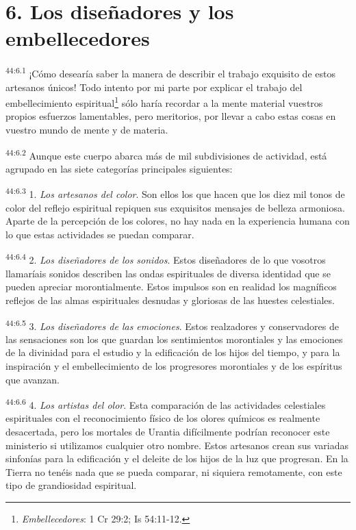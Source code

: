 \section*{6. Los diseñadores y los embellecedores}
\par
\textsuperscript{44:6.1} ¡Cómo desearía saber la manera de describir el trabajo exquisito de estos artesanos únicos! Todo intento por mi parte por explicar el trabajo del embellecimiento espiritual\footnote{\textit{Embellecedores}: 1 Cr 29:2; Is 54:11-12.} sólo haría recordar a la mente material vuestros propios esfuerzos lamentables, pero meritorios, por llevar a cabo estas cosas en vuestro mundo de mente y de materia.

\par
\textsuperscript{44:6.2} Aunque este cuerpo abarca más de mil subdivisiones de actividad, está agrupado en las siete categorías principales siguientes:

\par
\textsuperscript{44:6.3} 1. \textit{Los artesanos del color}. Son ellos los que hacen que los diez mil tonos de color del reflejo espiritual repiquen sus exquisitos mensajes de belleza armoniosa. Aparte de la percepción de los colores, no hay nada en la experiencia humana con lo que estas actividades se puedan comparar.

\par
\textsuperscript{44:6.4} 2. \textit{Los diseñadores de los sonidos}. Estos diseñadores de lo que vosotros llamaríais sonidos describen las ondas espirituales de diversa identidad que se pueden apreciar morontialmente. Estos impulsos son en realidad los magníficos reflejos de las almas espirituales desnudas y gloriosas de las huestes celestiales.

\par
\textsuperscript{44:6.5} 3. \textit{Los diseñadores de las emociones}. Estos realzadores y conservadores de las sensaciones son los que guardan los sentimientos morontiales y las emociones de la divinidad para el estudio y la edificación de los hijos del tiempo, y para la inspiración y el embellecimiento de los progresores morontiales y de los espíritus que avanzan.

\par
\textsuperscript{44:6.6} 4. \textit{Los artistas del olor}. Esta comparación de las actividades celestiales espirituales con el reconocimiento físico de los olores químicos es realmente desacertada, pero los mortales de Urantia difícilmente podrían reconocer este ministerio si utilizamos cualquier otro nombre. Estos artesanos crean sus variadas sinfonías para la edificación y el deleite de los hijos de la luz que progresan. En la Tierra no tenéis nada que se pueda comparar, ni siquiera remotamente, con este tipo de grandiosidad espiritual.

